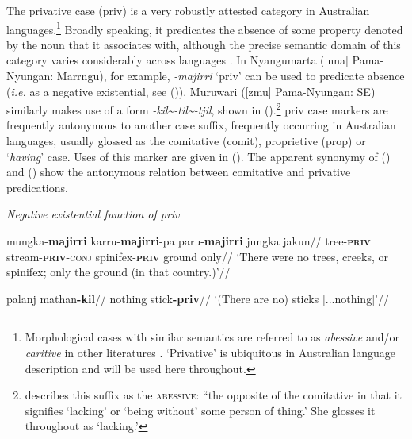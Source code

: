 \documentclass[usenames,dvipsnames,11pt]{article}
\begin{document}
{The privative case (\gls{priv}) is a very robustly attested category in Australian languages.\footnote{Morphological cases with similar semantics are referred to as \textit{abessive} and/or \textit{caritive} in other literatures \citep[\textit{e.g.} for Uralic in][]{Hamari2011,Hamari2015,Tamm2015}. `Privative' is ubiquitous in Australian language description and will be used here throughout.} Broadly speaking, it predicates the absence of some property denoted by the noun that it associates with, although the precise semantic domain of this category varies considerably across languages \citep[\textit{cf.} arguments for the predicative status of negative existential markers in ][139]{Veselinova2013}. In Nyangumarta ([\gls{nna}] Pama-Nyungan: Marrngu), for example, \textit{-majirri} `\gls{priv}' can be used to predicate absence (\textit{i.e.} as a negative existential, see ()). Muruwari ([\gls{zmu}] Pama-Nyungan: SE) similarly makes use of a form \textit{-kil\textasciitilde-til\textasciitilde-tjil}, shown in ().\footnote{\citet[77]{Oates1988} describes this suffix as the \textsc{abessive}: ``the opposite of the comitative in that it signifies `lacking' or `being without' some person of thing.' She glosses it throughout as `lacking.'}
\gls{priv} case markers are frequently antonymous to another case suffix, frequently occurring in Australian languages, usually glossed as the comitative (\gls{comit}), proprietive (\gls{prop}) or `\textit{having}' case. Uses of this marker are given in (\anextx). The apparent synonymy of () and () show the antonymous relation between comitative and privative predications.


\pex\textit{Negative existential function of \gls{priv}}

\a{} \begingl
\gla\rightcomment{[Nyangumarta]}mungka-\textbf{majirri} karru-\textbf{majirri}-pa paru-\textbf{majirri} jungka jakun//
\glb tree\textsc{-\textbf{priv}} stream\textsc{-\textbf{priv}-conj} spinifex\textsc{-\textbf{priv}} ground only//
\glft`There were no trees, creeks, or spinifex; only the ground (in that country.)'//\endgl

\a\begingl\gla\rightcomment{[Muruwari]}palanj mathan\textbf{-kil}//
\glb nothing stick\textbf{-\gls{priv}}//
\glft`(There are no) sticks [...nothing]'//\endgl

}
\end{document}
